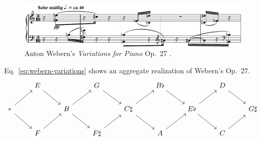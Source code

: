 \begin{figure}[htbp]
    \centering
	\includegraphics[width=6.5in]{figures/Webern_1.pdf}
	\caption[Webern's \emph{Variations for Piano} Op.~27]{Anton Webern's \emph{Variations for Piano} Op.~27 \cite[203]{Starr1984}.}
	\label{fig:webern-variations}
\end{figure}

\begin{example}
    \cite[204]{Starr1984}
    \label{ex:webern-variations}
    Eq.~\ref{eq:webern-variations} shows an aggregate realization of Webern's Op.~27.
    \begin{equation}
    \label{eq:webern-variations}
    \begin{tikzcd}
		& E \arrow[dr] && G \arrow[dr] && B\flat \arrow[dr] && D \arrow[dr] & \\
		* \arrow[dr] \arrow[ur] && B \arrow[dr] \arrow[ur] && C\sharp \arrow[dr] \arrow[ur] && E\flat \arrow[dr] \arrow[ur] && G\sharp \\
		& F \arrow[ur] && F\sharp \arrow[ur] && A \arrow[ur] && C \arrow[ur] &
	\end{tikzcd}	
    \end{equation}
\end{example}


